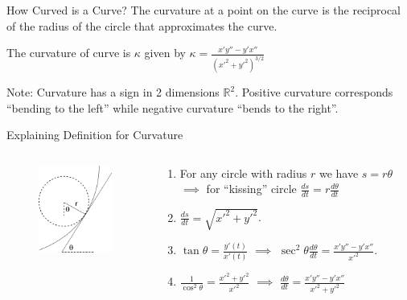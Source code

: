 \documentclass{beamer}
\begin{document}
\begin{frame}{How Curved is a Curve?}
	The curvature at a point on the curve is the reciprocal of the radius of the circle that approximates the curve.
	\begin{definition}[Curvature]
		The curvature of curve is $\kappa$ given by
		$\kappa=\frac{x' y'' - y' x''}{(x'^2+y'^2)^{3/2}}$
	\end{definition}
	Note: Curvature has a sign in 2 dimensions $\mathbb{R}^2$. Positive curvature corresponds ``bending to the left'' while negative curvature ``bends to the right''.
\end{frame}

\begin{frame}{Explaining Definition for Curvature}
	\begin{columns}
		\begin{column}{0.4\textwidth}
			\begin{figure}
				\centering
				\includegraphics[width=50mm, scale=0.4]{illustration.png}
			\end{figure}
		\end{column}
		\begin{column}{0.6\textwidth}
			\begin{enumerate}
				\item For any circle with radius $r$ we have $s=r \theta$ $\implies$ for ``kissing'' circle 
				$\frac{ds}{dt} = r \frac{d\theta}{dt}$
				
				\item $\frac{ds}{dt} = \sqrt{x'^2+y'^2}$.
				
				\item $\tan \theta = \frac{y'(t)}{x'(t)}$ $\implies$ $\sec ^2 \theta \frac{d\theta}{dt} = \frac{x' y'' - y' x''}{x'^2}$.
				
				\item $\frac{1}{\cos^2 \theta} = \frac{x'^2+y'^2}{x'^2}$ $\implies$
				$\frac{d\theta}{dt}=\frac{x' y'' - y' x''}{x'^2+y'^2}$
				

\end{enumerate}
\end{column}
\end{columns}
\end{frame}
\end{document}
